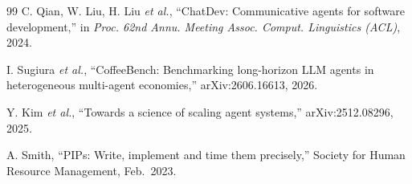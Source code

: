 \documentclass[conference]{IEEEtran}
\begin{document}
\begin{thebibliography}{99}
C. Qian, W. Liu, H. Liu \emph{et al.}, ``ChatDev: Communicative agents for
software development,'' in \emph{Proc. 62nd Annu. Meeting Assoc. Comput.
Linguistics (ACL)}, 2024.

I. Sugiura \emph{et al.}, ``CoffeeBench: Benchmarking long-horizon LLM agents in
heterogeneous multi-agent economies,'' arXiv:2606.16613, 2026.

Y. Kim \emph{et al.}, ``Towards a science of scaling agent systems,'' arXiv:2512.08296, 2025.

A. Smith, ``PIPs: Write, implement and time them precisely,'' Society for Human
Resource Management, Feb.~2023.

\end{thebibliography}
\end{document}
